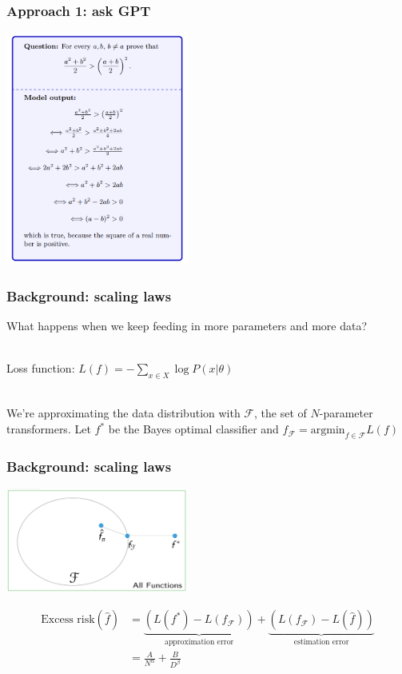 \documentclass{beamer}
\begin{document}
\begin{frame}
\frametitle{Approach 1: ask GPT}
\begin{center}
\includegraphics[width=0.45\textwidth]{img/minerva_example.png} 
\end{center}
\end{frame}

\begin{frame}
\frametitle{Background: scaling laws}
What happens when we keep feeding in more parameters and more data?\\~\

Loss function: $L(f) = -\sum_{x\in X}\log P(x | \theta)$\\~\

We're approximating the data distribution with $\mathcal{F}$, the set of $N$-parameter transformers. Let $f^*$ be the Bayes optimal classifier and $f_{\mathcal{F}} = \mathrm{argmin}_{f\in \mathcal{F}} L(f)$
\end{frame}

\begin{frame}
\frametitle{Background: scaling laws}
\begin{center}
\includegraphics[width=0.45\textwidth]{img/excess_risk.png}
\end{center}
\begin{align*}
    \text{Excess risk}(\hat{f}) &= \underbrace{\left(L(f^*) - L(f_{\mathcal{F}})\right)}_{\text{approximation error}} + \underbrace{\left(L(f_{\mathcal{F}}) - L( \hat{f})\right)}_{\text{estimation error}}\\ 
                                &= \frac{A}{N^\alpha} + \frac{B}{D^\beta}
\end{align*}
\end{frame}
\end{document}

